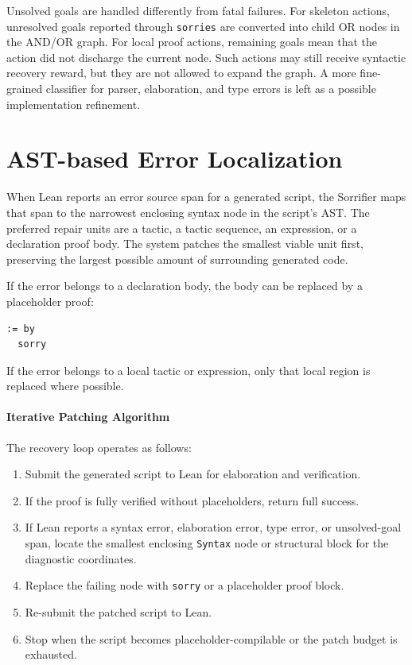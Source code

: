 Unsolved goals are handled differently from fatal failures. For skeleton actions, unresolved goals reported
through \texttt{sorries} are converted into child OR nodes in the AND/OR graph. For local proof
actions, remaining goals mean that the action did not discharge the current node. Such actions may still
receive syntactic recovery reward, but they are not allowed to expand the graph. A more fine-grained
classifier for parser, elaboration, and type errors is left as a possible implementation refinement.

\section{AST-based Error Localization}

When Lean reports an error source span for a generated script, the Sorrifier maps that span to the narrowest enclosing syntax node in the script's AST. The preferred repair units are a tactic, a tactic sequence, an expression, or a declaration proof body. The system patches the smallest viable unit first, preserving the largest possible amount of surrounding generated code.

If the error belongs to a declaration body, the body can be replaced by a placeholder proof:
\begin{verbatim}
:= by
  sorry
\end{verbatim}
If the error belongs to a local tactic or expression, only that local region is replaced where possible.

\paragraph{Iterative Patching Algorithm}

The recovery loop operates as follows:
\begin{enumerate}
    \item Submit the generated script to Lean for elaboration and verification.
    \item If the proof is fully verified without placeholders, return full success.
    \item If Lean reports a syntax error, elaboration error, type error, or unsolved-goal span, locate the smallest enclosing \texttt{Syntax} node or structural block for the diagnostic coordinates.
    \item Replace the failing node with \texttt{sorry} or a placeholder proof block.
    \item Re-submit the patched script to Lean.
    \item Stop when the script becomes placeholder-compilable or the patch budget is exhausted.
\end{enumerate}

